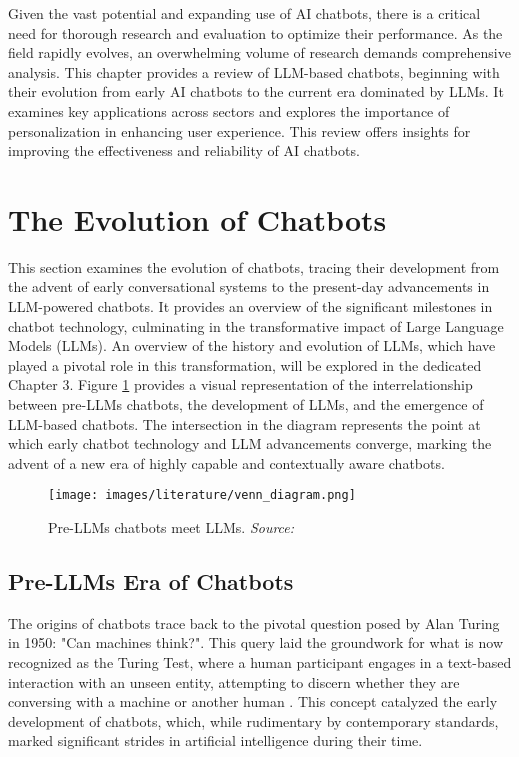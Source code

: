 Given the vast potential and expanding use of AI chatbots, there is a critical need for thorough research and evaluation to optimize their performance. As the field rapidly evolves, an overwhelming volume of research demands comprehensive analysis. This chapter provides a review of LLM-based chatbots, beginning with their evolution from early AI chatbots to the current era dominated by LLMs. It examines key applications across sectors and explores the importance of personalization in enhancing user experience. This review offers insights for improving the effectiveness and reliability of AI chatbots.

\section{The Evolution of Chatbots}

This section examines the evolution of chatbots, tracing their development from the advent of early conversational systems to the present-day advancements in LLM-powered chatbots. It provides an overview of the significant milestones in chatbot technology, culminating in the transformative impact of Large Language Models (LLMs). An overview of the history and evolution of LLMs, which have played a pivotal role in this transformation, will be explored in the dedicated Chapter 3. Figure \ref{fig:chatbot_venn_diagram} provides a visual representation of the interrelationship between pre-LLMs chatbots, the development of LLMs, and the emergence of LLM-based chatbots. The intersection in the diagram represents the point at which early chatbot technology and LLM advancements converge, marking the advent of a new era of highly capable and contextually aware chatbots.

\begin{figure}[h!]
    \centering
    \texttt{[image: images/literature/venn\_diagram.png]}
    \caption{Pre-LLMs chatbots meet LLMs. \textit{Source:} \cite{dam2024complete}}
    \label{fig:chatbot_venn_diagram}
\end{figure}

\subsection{Pre-LLMs Era of Chatbots}

The origins of chatbots trace back to the pivotal question posed by Alan Turing in 1950: "Can machines think?". This query laid the groundwork for what is now recognized as the Turing Test, where a human participant engages in a text-based interaction with an unseen entity, attempting to discern whether they are conversing with a machine or another human \cite{turing2009computing}. This concept catalyzed the early development of chatbots, which, while rudimentary by contemporary standards, marked significant strides in artificial intelligence during their time.

